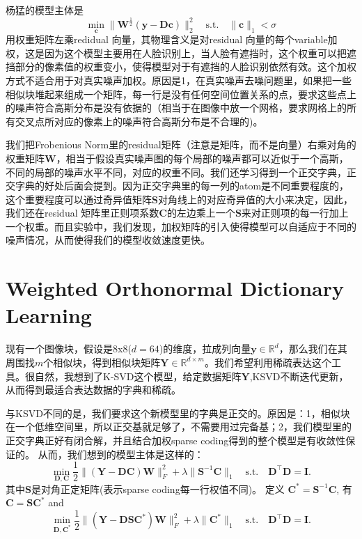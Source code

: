 \documentclass[10pt,twocolumn,letterpaper]{article}
\begin{document}
杨猛的模型\cite{yang2011robust}主体是
\begin{equation}
\min_{\mathbf{c}}\|\mathbf{W}^{\frac{1}{2}}(\mathbf{y}-\mathbf{D}\mathbf{c})\|_{2}^{2}
\quad
\text{s.t.}
\quad
\|\mathbf{c}\|_{1}<\sigma
\end{equation}
用权重矩阵左乘redidual 向量，其物理含义是对residual 向量的每个variable加权，这是因为这个模型主要用在人脸识别上，当人脸有遮挡时，这个权重可以把遮挡部分的像素值的权重变小，使得模型对于有遮挡的人脸识别依然有效。这个加权方式不适合用于对真实噪声加权。原因是1，在真实噪声去噪问题里，如果把一些相似块堆起来组成一个矩阵，每一行是没有任何空间位置关系的点，要求这些点上的噪声符合高斯分布是没有依据的（相当于在图像中放一个网格，要求网格上的所有交叉点所对应的像素上的噪声符合高斯分布是不合理的)。

我们把Frobenious Norm里的residual矩阵（注意是矩阵，而不是向量）右乘对角的权重矩阵$\mathbf{W}$，相当于假设真实噪声图的每个局部的噪声都可以近似于一个高斯，不同的局部的噪声水平不同，对应的权重不同。我们还学习得到一个正交字典，正交字典的好处后面会提到。因为正交字典里的每一列的atom是不同重要程度的，这个重要程度可以通过奇异值矩阵$\mathbf{S}$对角线上的对应奇异值的大小来决定，因此，我们还在residual 矩阵里正则项系数$\mathbf{C}$的左边乘上一个$\mathbf{S}$来对正则项的每一行加上一个权重。而且实验中，我们发现，加权矩阵的引入使得模型可以自适应于不同的噪声情况，从而使得我们的模型收敛速度更快。

\section{Weighted Orthonormal Dictionary Learning}
现有一个图像块，假设是8x8($d=64$)的维度，拉成列向量$\mathbf{y}\in\mathbb{R}^{d}$，那么我们在其周围找$m$个相似块，得到相似块矩阵$\mathbf{Y}\in\mathbb{R}^{d\times m}$。我们希望利用稀疏表达这个工具。很自然，我想到了K-SVD这个模型，给定数据矩阵$\mathbf{Y}$,KSVD不断迭代更新，从而得到最适合表达数据的字典和稀疏。

与KSVD不同的是，我们要求这个新模型里的字典是正交的。原因是：1，相似块在一个低维空间里，所以正交基就足够了，不需要用过完备基；2，我们模型里的正交字典正好有闭合解，并且结合加权sparse coding得到的整个模型是有收敛性保证的。
从而，我们想到的模型主体是这样的：
\begin{equation}\label{wlswsc}
\min_{\mathbf{D},\mathbf{C}}\frac{1}{2}\|(\mathbf{Y}-\mathbf{D}\mathbf{C})\mathbf{W}\|_{F}^{2}
+
\lambda\|\mathbf{S}^{-1}\mathbf{C}\|_{1}
\quad
\text{s.t.}
\quad
\mathbf{D}^{\top}\mathbf{D} =\mathbf{I}. 
\end{equation}
其中$\mathbf{S}$是对角正定矩阵(表示sparse coding每一行权值不同)。
定义 $\mathbf{C}^{*}=\mathbf{S}^{-1}\mathbf{C}$, 有$\mathbf{C}=\mathbf{S}\mathbf{C}^{*}$ and 
\begin{equation}
\min_{\mathbf{D},\mathbf{C}^{*}}\frac{1}{2}\|(\mathbf{Y}-\mathbf{D}\mathbf{S}\mathbf{C}^{*})\mathbf{W}\|_{F}^{2} 
+
\lambda\|\mathbf{C}^{*}\|_{1}
\quad
\text{s.t.}
\quad
\mathbf{D}^{\top}\mathbf{D} = \mathbf{I}.
\end{equation}
\end{document}
